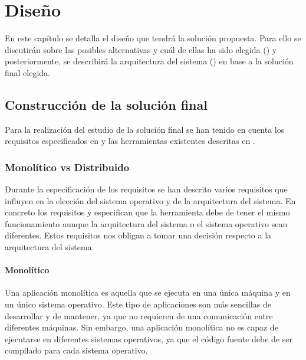 \chapter{Diseño}\label{chap:diseno}

En este capítulo se detalla el diseño que tendrá la solución propuesta. Para ello se discutirán sobre las posibles alternativas y cuál de ellas ha sido elegida () y posteriormente, se describirá la arquitectura del sistema () en base a la solución final elegida.

\section{Construcción de la solución final}\label{sec:estudio-solucion-final}

Para la realización del estudio de la solución final se han tenido en cuenta los requisitos especificados en  y las herramientas existentes descritas en . 

\subsection{Monolítico vs Distribuido} \label{subsec:monolitico-vs-distribuido}

Durante la especificación de los requisitos se han descrito varios requisitos que influyen en la elección del sistema operativo y de la arquitectura del sistema. En concreto los requisitos  y  especifican que la herramienta debe de tener el mismo funcionamiento aunque la arquitectura del sistema o el sistema operativo sean diferentes. Estos requisitos nos obligan a tomar una decisión respecto a la arquitectura del sistema. 

\subsubsection{Monolítico} \label{subsubsec:monolitico}

Una \gls{aplicación monolítica} \cite{DistributedSystems} es aquella que se ejecuta en una única máquina y en un único sistema operativo. Este tipo de aplicaciones son más sencillas de desarrollar y de mantener, ya que no requieren de una comunicación entre diferentes máquinas. Sin embargo, una \gls{aplicación monolítica} no es capaz de ejecutarse en diferentes sistemas operativos, ya que el \gls{código fuente} debe de ser compilado para cada sistema operativo. 

